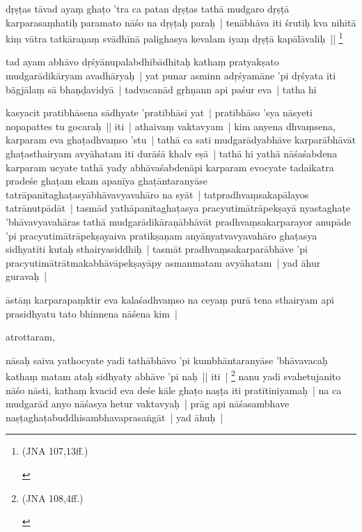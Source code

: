 \documentclass[article,12pt,a4paper]{memoir}
\begin{document}
	  \pstart dṛṣṭas tāvad ayaṃ ghaṭo 'tra ca patan dṛṣṭas tathā mudgaro dṛṣṭā karparasaṃhatiḥ paramato nāśo na dṛṣṭaḥ paraḥ | tenābhāva iti śrutiḥ kva nihitā kiṃ vātra tatkāraṇaṃ svādhīnā palighasya kevalam iyaṃ dṛṣṭā kapālāvaliḥ || \footnote{\begin{english}(JNA 107,13ff.)\end{english}}
	\pend
      

	  \pstart tad ayam abhāvo dṛśyānupalabdhibādhitaḥ kathaṃ pratyakṣato mudgarādikāryam avadhāryaḥ | \label{thakur75-118.29} yat punar asminn adṛśyamāne 'pi dṛśyata iti bāgjālaṃ sā bhaṇḍavidyā | tadvacanād gṛhṇann api paśur eva | tatha hi
	\pend
      

	  \pstart kasyacit pratibhāsena sādhyate 'pratibhāsi yat | pratibhāso 'sya nāsyeti nopapattes tu gocaraḥ || iti | \label{thakur75-119.1} athaivaṃ vaktavyam | kim anyena dhvaṃsena, karparam eva ghaṭadhvaṃso 'stu | tathā ca sati mudgarādyabhāve karparābhāvāt ghaṭasthairyam avyāhatam iti \label{thakur75-119.2} durāśā khalv eṣā | tathā hi yathā nāśaśabdena karparam ucyate tathā yady abhāvaśabdenāpi karparam evocyate tadaikatra pradeśe ghaṭam ekam apanīya ghaṭāntaranyāse tatrāpanītaghaṭasyābhāvavyavahāro na syāt | tatpradhvaṃsakapālayos tatrānutpādāt | tasmād yathāpanītaghaṭasya pracyutimātrāpekṣayā nyastaghaṭe 'bhāvavyavahāras tathā mudgarādikāraṇābhāvāt pradhvaṃsakarparayor anupāde 'pi pracyutimātrāpekṣayaiva pratikṣaṇam anyānyatvavyavahāro ghaṭasya sidhyatīti kutaḥ sthairyasiddhiḥ | tasmāt pradhvaṃsakarparābhāve 'pi pracyutimātrātmakabhāvāpekṣayāpy asmanmatam avyāhatam | \label{thakur75-119.9} yad āhur guravaḥ |
	\pend
      

	  \pstart āstāṃ karparapaṃktir eva kalaśadhvaṃso na ceyaṃ purā tena sthairyam api prasidhyatu tato bhinnena nāśena kim |
	\pend
      

	  \pstart atrottaram,
	\pend
      

	  \pstart nāsaḥ saiva yathocyate yadi tathābhāvo 'pi kumbhāntaranyāse 'bhāvavacaḥ kathaṃ matam ataḥ sidhyaty abhāve 'pi naḥ || iti | \footnote{\begin{english}(JNA 108,4ff.)\end{english}} \label{thakur75-119.16} nanu yadi svahetujanito nāśo nāsti, kathaṃ kvacid eva deśe kāle ghaṭo naṣṭa iti pratītiniyamaḥ | na ca mudgarād anyo nāśasya hetur vaktavyaḥ | prāg api nāśasambhave naṣṭaghaṭabuddhisambhavaprasaṅgāt | yad āhuḥ |
	\pend
      
\end{document}
